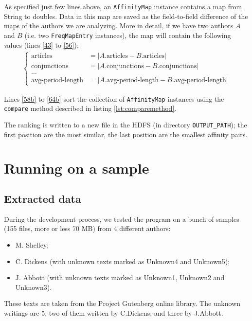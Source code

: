 \documentclass[a4paper,11pt, twoside]{article}
\begin{document}
 	\bigskip
 	\noindent
	As specified just few lines above, an \lstinline|AffinityMap| instance contains a map from String to doubles. Data in this map are saved as the field-to-field difference of the maps of the authors we are analyzing. More in detail, if we have two authors $A$ and $B$ (i.e. two \lstinline|FreqMapEntry| instances), the map will contain the following values (lines \ref{43} to \ref{56}):
	\begin{align*}
		\begin{cases}
			\text{articles} &= |A.\text{articles} - B.\text{articles}| \\
			\text{conjunctions} &= |A. \text{conjunctions}- B.\text{conjunctions}| \\
			\dots& \\
			\text{avg-period-length}&= |A.\text{avg-period-length} - B.\text{avg-period-length}|
		\end{cases}
	\end{align*}
	
	Lines \ref{58b} to \ref{64b} sort the collection of \lstinline|AffinityMap| instances using the \lstinline|compare| method described in listing \ref{lst:comparemethod}.
	
	The ranking is written to a new file in the HDFS (in directory \lstinline|OUTPUT_PATH|); the first position are the most similar, the last position are the smallest affinity pairs.
	

	
	\newpage
	\section{Running on a sample}\label{sample}
	\subsection{Extracted data}
	During the development process, we tested the program on a bunch of samples (155 files, more or less 70 MB) from 4 different authors: \begin{itemize}
	\item M. Shelley;
	\item C. Dickens (with unknown texts marked as Unknown4 and Unknown5);
	\item J. Abbott (with unknown texts marked as Unknown1, Unknown2 and Unknown3).
\end{itemize}

These texts are taken from the Project Gutenberg online library. The unknown writings are 5, two of them written by C.Dickens, and three by J.Abbott.
\end{document}
